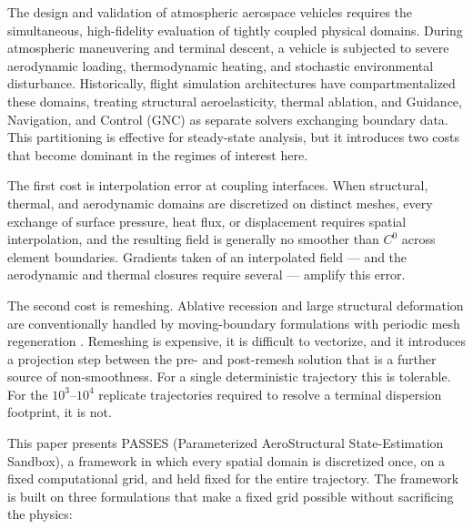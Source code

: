 \documentclass[11pt,a4paper]{article}
\theoremstyle{definition}
\numberwithin{equation}{section}
\begin{document}
The design and validation of atmospheric aerospace vehicles requires the simultaneous, high-fidelity evaluation of tightly coupled physical domains. During atmospheric maneuvering and terminal descent, a vehicle is subjected to severe aerodynamic loading, thermodynamic heating, and stochastic environmental disturbance. Historically, flight simulation architectures have compartmentalized these domains, treating structural aeroelasticity, thermal ablation, and Guidance, Navigation, and Control (GNC) as separate solvers exchanging boundary data. This partitioning is effective for steady-state analysis, but it introduces two costs that become dominant in the regimes of interest here.

The first cost is interpolation error at coupling interfaces. When structural, thermal, and aerodynamic domains are discretized on distinct meshes, every exchange of surface pressure, heat flux, or displacement requires spatial interpolation, and the resulting field is generally no smoother than $C^0$ across element boundaries. Gradients taken of an interpolated field --- and the aerodynamic and thermal closures require several --- amplify this error.

The second cost is remeshing. Ablative recession and large structural deformation are conventionally handled by moving-boundary formulations with periodic mesh regeneration \cite{shyy1996, crank1984}. Remeshing is expensive, it is difficult to vectorize, and it introduces a projection step between the pre- and post-remesh solution that is a further source of non-smoothness. For a single deterministic trajectory this is tolerable. For the $10^3$--$10^4$ replicate trajectories required to resolve a terminal dispersion footprint, it is not.

This paper presents PASSES (Parameterized AeroStructural State-Estimation Sandbox), a framework in which every spatial domain is discretized once, on a fixed computational grid, and held fixed for the entire trajectory. The framework is built on three formulations that make a fixed grid possible without sacrificing the physics:
\end{document}
